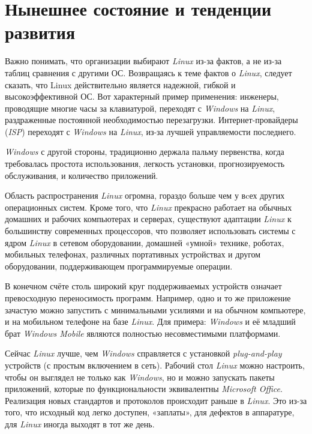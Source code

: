 \section{Нынешнее состояние и тенденции развития}

Важно понимать, что организации выбирают \textit{Linux} из-за фактов, а не из-за таблиц сравнения с другими ОС. Возвращаясь к теме фактов о \textit{Linux}, следует сказать, что Linux действительно является надежной, гибкой и высокоэффективной ОС. Вот характерный пример применения: инженеры, проводящие многие часы за клавиатурой, переходят с \textit{Windows} на \textit{Linux}, раздраженные постоянной необходимостью перезагрузки. Интернет-провайдеры (\textit{ISP}) переходят с \textit{Windows} на \textit{Linux}, из-за лучшей управляемости последнего.

\textit{Windows} с другой стороны, традиционно держала пальму первенства, когда требовалась простота использования, легкость установки, прогнозируемость обслуживания, и количество приложений.

Область распространения \textit{Linux} огромна, гораздо больше чем у вcех других операционных систем. Кроме того, что \textit{Linux} прекрасно работает на обычных домашних и рабочих компьютерах и серверах, существуют адаптации \textit{Linux} к большинству современных процессоров, что позволяет использовать системы с ядром \textit{Linux} в сетевом оборудовании, домашней «умной» технике, роботах, мобильных телефонах, различных портативных устройствах и другом оборудовании, поддерживающем программируемые операции.

В конечном счёте столь широкий круг поддерживаемых устройств означает превосходную переносимость программ. Например, одно и то же приложение зачастую можно запустить с минимальными усилиями и на обычном компьютере, и на мобильном телефоне на базе \textit{Linux}. Для примера: \textit{Windows} и её младший брат \textit{Windows Mobile} являются полностью несовместимыми платформами.

Сейчас \textit{Linux} лучше, чем \textit{Windows} справляется с установкой \textit{plug-and-play} устройств (с простым включением в сеть). Рабочий стол \textit{Linux} можно настроить, чтобы он выглядел не только как \textit{Windows}, но и можно запускать пакеты приложений, которые по функциональности эквивалентны \textit{Microsoft Office}. Реализация новых стандартов и протоколов происходит раньше в \textit{Linux}. Это из-за того, что исходный код легко доступен, «заплаты», для дефектов в аппаратуре, для \textit{Linux} иногда выходят в тот же день.

